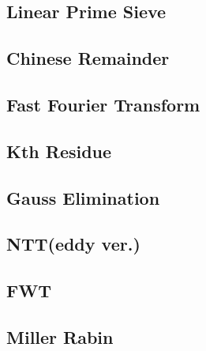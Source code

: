 \documentclass[a4paper,10pt,twocolumn,oneside]{article}
\begin{document}
\subsection{Linear Prime Sieve}


% 

\subsection{Chinese Remainder}


\subsection{Fast Fourier Transform}


\subsection{Kth Residue}


\subsection{Gauss Elimination}


% 

\subsection{NTT(eddy ver.)}


\subsection{FWT}


\subsection{Miller Rabin}

\end{document}
